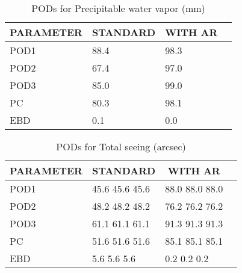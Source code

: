 \documentclass[11pt,english]{article}
\begin{document}
\begin{table}[]
\begin{center}
\begin{tabular}{|l|l|l|l|}
\hline
\multicolumn{1}{|c|}{\cellcolor[HTML]{C0C0C0}\textbf{PARAMETER}} & \multicolumn{1}{c|}{\cellcolor[HTML]{C0C0C0}\textbf{STANDARD}} & \multicolumn{1}{c|}{\cellcolor[HTML]{C0C0C0}\textbf{WITH AR}} \\
\hline
\cellcolor[HTML]{C0C0C0}POD1  & 88.4                                & 98.3         \\
\cellcolor[HTML]{C0C0C0}POD2  & 67.4                                & 97.0         \\
\cellcolor[HTML]{C0C0C0}POD3  & 85.0                                & 99.0         \\
\cellcolor[HTML]{C0C0C0}PC    & 80.3                                  & 98.1           \\
\cellcolor[HTML]{C0C0C0}EBD   & 0.1                                 & 0.0          \\
\hline
\end{tabular}
\caption{PODs for Precipitable water vapor (mm)}
\end{center}
\end{table}
\begin{table}[]
\begin{center}
\begin{tabular}{|l|l|l|l|}
\hline
\multicolumn{1}{|c|}{\cellcolor[HTML]{C0C0C0}\textbf{PARAMETER}} & \multicolumn{1}{c|}{\cellcolor[HTML]{C0C0C0}\textbf{STANDARD}} & \multicolumn{1}{c|}{\cellcolor[HTML]{C0C0C0}\textbf{WITH AR}} \\
\hline
\cellcolor[HTML]{C0C0C0}POD1  & 45.6
45.6
45.6                                & 88.0
88.0
88.0         \\
\cellcolor[HTML]{C0C0C0}POD2  & 48.2
48.2
48.2                                & 76.2
76.2
76.2         \\
\cellcolor[HTML]{C0C0C0}POD3  & 61.1
61.1
61.1                                & 91.3
91.3
91.3         \\
\cellcolor[HTML]{C0C0C0}PC    & 51.6
51.6
51.6                                  & 85.1
85.1
85.1           \\
\cellcolor[HTML]{C0C0C0}EBD   & 5.6
5.6
5.6                                 & 0.2
0.2
0.2          \\
\hline
\end{tabular}
\caption{PODs for Total seeing (arcsec)}
\end{center}
\end{table}
\end{document}
